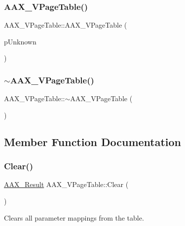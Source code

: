 \subsubsection{\texorpdfstring{AAX\_VPageTable()}{AAX\_VPageTable()}}
{\footnotesize\ttfamily A\+A\+X\+\_\+\+V\+Page\+Table\+::\+A\+A\+X\+\_\+\+V\+Page\+Table (\begin{DoxyParamCaption}\item[{\mbox{\hyperlink{a01409}{I\+A\+C\+F\+Unknown}} $\ast$}]{p\+Unknown }\end{DoxyParamCaption})}

\mbox{\label{a01929_aa525cc1f5faf35ff2c927950b89ce52b}} 
\subsubsection{\texorpdfstring{$\sim$AAX\_VPageTable()}{~AAX\_VPageTable()}}
{\footnotesize\ttfamily A\+A\+X\+\_\+\+V\+Page\+Table\+::$\sim$\+A\+A\+X\+\_\+\+V\+Page\+Table (\begin{DoxyParamCaption}{ }\end{DoxyParamCaption})}



\subsection{Member Function Documentation}
\mbox{\label{a01929_aacd53ddee67cffcd326c66a4f8fcd1aa}} 
\subsubsection{\texorpdfstring{Clear()}{Clear()}}
{\footnotesize\ttfamily \mbox{\hyperlink{a00392_a4d8f69a697df7f70c3a8e9b8ee130d2f}{A\+A\+X\+\_\+\+Result}} A\+A\+X\+\_\+\+V\+Page\+Table\+::\+Clear (\begin{DoxyParamCaption}{ }\end{DoxyParamCaption})\hspace{0.3cm}{\ttfamily [virtual]}}



Clears all parameter mappings from the table. 

